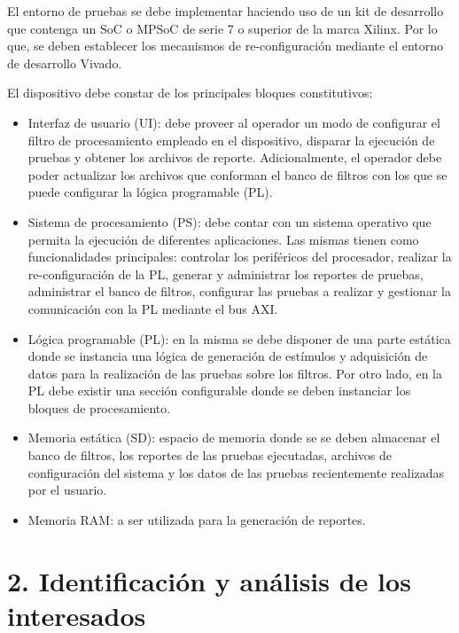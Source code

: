 \documentclass[
11pt, %
]{charter}
\begin{document}
El entorno de pruebas se debe implementar haciendo uso de un kit de desarrollo que contenga un SoC o MPSoC de serie 7 o superior de la marca Xilinx. Por lo que, se deben establecer los mecanismos de re-configuración mediante el entorno de desarrollo Vivado.

El dispositivo debe constar de los principales bloques constitutivos:
\begin{itemize}
	\item Interfaz de usuario (UI): debe proveer al operador un modo de configurar el filtro de procesamiento empleado en el dispositivo, disparar la ejecución de pruebas y obtener los archivos de reporte. Adicionalmente, el operador debe poder actualizar los archivos que conforman el banco de filtros con los que se puede configurar la lógica programable (PL).
	\item Sistema de procesamiento (PS): debe contar con un sistema operativo que permita la ejecución de diferentes aplicaciones. Las mismas tienen como funcionalidades principales: controlar los periféricos del procesador, realizar la re-configuración de la PL, generar y administrar los reportes de pruebas, administrar el banco de filtros, configurar las pruebas a realizar y gestionar la comunicación con la PL mediante el bus AXI.
	\item Lógica programable (PL): en la misma se debe disponer de una parte estática donde se instancia una lógica de generación de estímulos y adquisición de datos para la realización de las pruebas sobre los filtros. Por otro lado, en la PL debe existir una sección configurable donde se deben instanciar los bloques de procesamiento.
	\item Memoria estática (SD): espacio de memoria donde se se deben almacenar el banco de filtros, los reportes de las pruebas ejecutadas, archivos de configuración del sistema y los datos de las pruebas recientemente realizadas por el usuario.
	\item Memoria RAM: a ser utilizada para la generación de reportes.
\end{itemize}

 
\section{2. Identificación y análisis de los interesados}
\label{sec:interesados}
\end{document}
